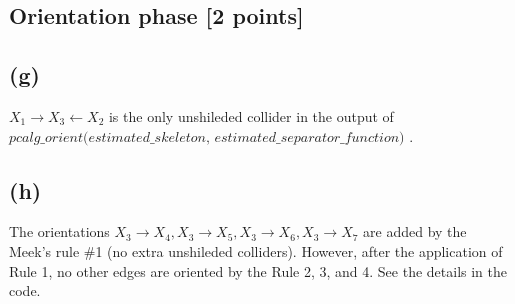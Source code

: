 \documentclass[10pt]{article}
\begin{document}
\subsection{Orientation phase [2 points]}
\subsection*{(g)}
$X_1 \rightarrow X_3 \leftarrow X_2$ is the only unshileded collider in the output of $\textit{pcalg\_orient(estimated\_skeleton, estimated\_separator\_function) }$. 

\subsection*{(h)}

The orientations $X_3 \rightarrow X_4, X_3 \rightarrow X_5, X_3 \rightarrow X_6, X_3 \rightarrow X_7$ are added by the Meek's rule \#1 (no extra unshileded colliders).
However, after the application of Rule 1, no other edges are oriented by the Rule 2, 3, and 4. See the details in the code.
\end{document}
